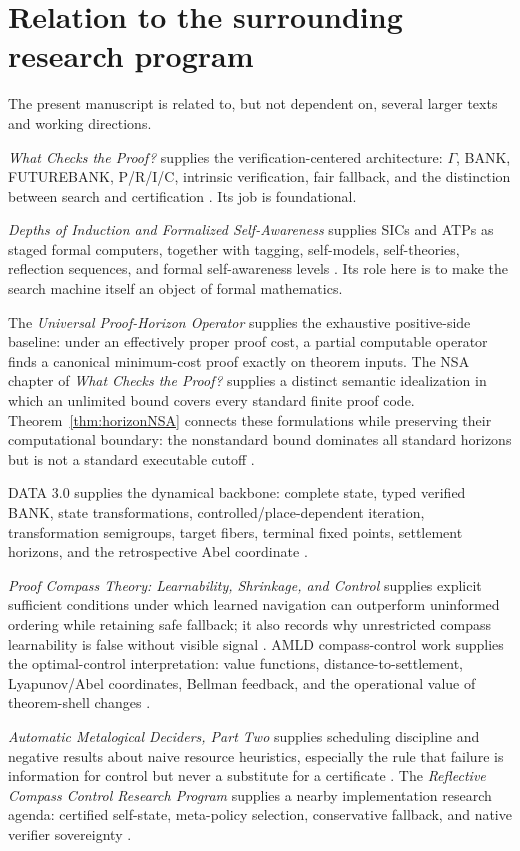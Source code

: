 \documentclass[11pt]{article}
\theoremstyle{definition}
\theoremstyle{remark}
\begin{document}
\section{Relation to the surrounding research program}

The present manuscript is related to, but not dependent on, several larger texts and working directions.

\emph{What Checks the Proof?} supplies the verification-centered architecture: $\Gamma$, BANK, FUTUREBANK, P/R/I/C, intrinsic verification, fair fallback, and the distinction between search and certification \cite{WCTP}. Its job is foundational.

\emph{Depths of Induction and Formalized Self-Awareness} supplies SICs and ATPs as staged formal computers, together with tagging, self-models, self-theories, reflection sequences, and formal self-awareness levels \cite{Depths}. Its role here is to make the search machine itself an object of formal mathematics.

The \emph{Universal Proof-Horizon Operator} supplies the exhaustive positive-side baseline: under an effectively proper proof cost, a partial computable operator finds a canonical minimum-cost proof exactly on theorem inputs. The NSA chapter of \emph{What Checks the Proof?} supplies a distinct semantic idealization in which an unlimited bound covers every standard finite proof code. Theorem~\ref{thm:horizonNSA} connects these formulations while preserving their computational boundary: the nonstandard bound dominates all standard horizons but is not a standard executable cutoff \cite{ProofHorizon,WCTP}.

DATA 3.0 supplies the dynamical backbone: complete state, typed verified BANK, state transformations, controlled/place-dependent iteration, transformation semigroups, target fibers, terminal fixed points, settlement horizons, and the retrospective Abel coordinate \cite{Data3}.

\emph{Proof Compass Theory: Learnability, Shrinkage, and Control} supplies explicit sufficient conditions under which learned navigation can outperform uninformed ordering while retaining safe fallback; it also records why unrestricted compass learnability is false without visible signal \cite{ProofCompass}. AMLD compass-control work supplies the optimal-control interpretation: value functions, distance-to-settlement, Lyapunov/Abel coordinates, Bellman feedback, and the operational value of theorem-shell changes \cite{CompassControl}.

\emph{Automatic Metalogical Deciders, Part Two} supplies scheduling discipline and negative results about naive resource heuristics, especially the rule that failure is information for control but never a substitute for a certificate \cite{AMLD2}. The \emph{Reflective Compass Control Research Program} supplies a nearby implementation research agenda: certified self-state, meta-policy selection, conservative fallback, and native verifier sovereignty \cite{ReflectiveCompass}.
\end{document}
